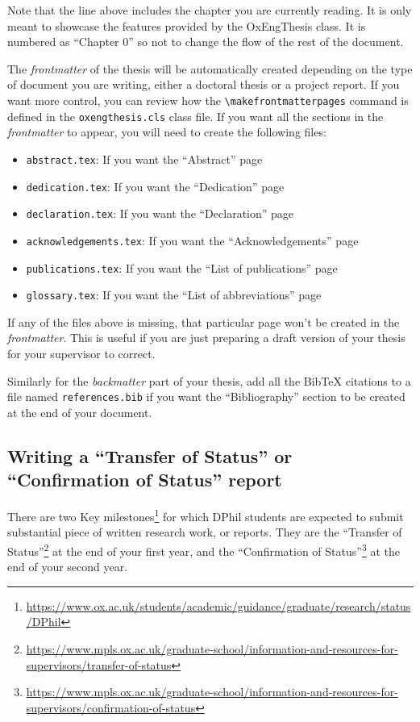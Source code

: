 Note that the line above includes the chapter you are currently reading. It is only meant to showcase the features provided by the OxEngThesis class. It is numbered as ``Chapter 0''
so not to change the flow of the rest of the document.

The \textit{frontmatter} of the thesis will be automatically created depending on the type of document you are writing, either a doctoral thesis or a project report. If you want more control, you can review how the \verb|\makefrontmatterpages| command is defined in the \verb|oxengthesis.cls| class file. If you want all the sections in the \textit{frontmatter} to appear, you will need to create the following files:

\begin{itemize}
    \item \verb|abstract.tex|: If you want the ``Abstract'' page
    \item \verb|dedication.tex|: If you want the ``Dedication'' page
    \item \verb|declaration.tex|: If you want the ``Declaration'' page
    \item \verb|acknowledgements.tex|: If you want the ``Acknowledgements'' page
    \item \verb|publications.tex|: If you want the ``List of publications'' page
    \item \verb|glossary.tex|: If you want the ``List of abbreviations'' page
\end{itemize}

If any of the files above is missing, that particular page won't be created in the \textit{frontmatter}. This is useful if you are just preparing a draft version of your thesis for your supervisor to correct. 

Similarly for the \textit{backmatter} part of your thesis, add all the BibTeX citations to a file named \verb|references.bib| if you want the ``Bibliography'' section to be created at the end of your document. 


\subsection{Writing a ``Transfer of Status'' or ``Confirmation of Status'' report}


There are two Key milestones\footnote{\url{https://www.ox.ac.uk/students/academic/guidance/graduate/research/status/DPhil}}
for which DPhil students are expected to submit substantial piece of written 
research work, or reports. They are the
``Transfer of Status''\footnote{\url{https://www.mpls.ox.ac.uk/graduate-school/information-and-resources-for-supervisors/transfer-of-status}}
at the end of your first year, and the
``Confirmation of Status''\footnote{\url{https://www.mpls.ox.ac.uk/graduate-school/information-and-resources-for-supervisors/confirmation-of-status}}
at the end of your second year. 


